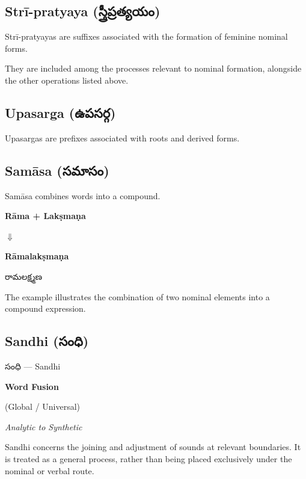\documentclass[12pt,a4paper]{article}
\newcommand{\te}[1]{{\telugufont #1}}
\begin{document}
\subsection{Strī-pratyaya (\te{స్త్రీప్రత్యయం})}

Strī-pratyayas are suffixes associated with the formation of
feminine nominal forms.

They are included among the processes relevant to nominal
formation, alongside the other operations listed above.

\subsection{Upasarga (\te{ఉపసర్గ})}

Upasargas are prefixes associated with roots and derived forms.

\subsection{Samāsa (\te{సమాసం})}

Samāsa combines words into a compound.

\begin{mainbox}
\centering
\textbf{Rāma + Lakṣmaṇa}

\vspace{2mm}
$\Downarrow$

\vspace{2mm}
\textbf{Rāmalakṣmaṇa}

\vspace{2mm}
\te{రామలక్ష్మణ}
\end{mainbox}

The example illustrates the combination of two nominal elements
into a compound expression.

\subsection{Sandhi (\te{సంధి})}

\begin{mainbox}
\centering
{\Large\te{సంధి} --- Sandhi}

\vspace{2mm}
\textbf{Word Fusion}

(Global / Universal)

\vspace{2mm}
\textit{Analytic to Synthetic}
\end{mainbox}

Sandhi concerns the joining and adjustment of sounds at relevant
boundaries. It is treated as a general process, rather than
being placed exclusively under the nominal or verbal route.
\end{document}
